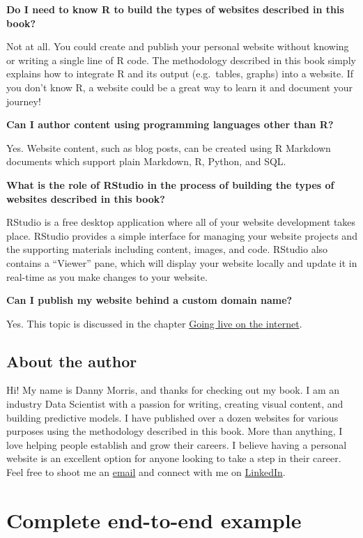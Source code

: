 \documentclass[
]{book}
\begin{document}
\textbf{Do I need to know R to build the types of websites described in this book?}

Not at all. You could create and publish your personal website without knowing or writing a single line of R code. The methodology described in this book simply explains how to integrate R and its output (e.g.~tables, graphs) into a website. If you don't know R, a website could be a great way to learn it and document your journey!

\textbf{Can I author content using programming languages other than R?}

Yes. Website content, such as blog posts, can be created using R Markdown documents which support plain Markdown, R, Python, and SQL.

\textbf{What is the role of RStudio in the process of building the types of websites described in this book?}

RStudio is a free desktop application where all of your website development takes place. RStudio provides a simple interface for managing your website projects and the supporting materials including content, images, and code. RStudio also contains a ``Viewer'' pane, which will display your website locally and update it in real-time as you make changes to your website.

\textbf{Can I publish my website behind a custom domain name?}

Yes. This topic is discussed in the chapter \protect\hyperlink{deploy}{Going live on the internet}.

\hypertarget{about-the-author}{%
\section{About the author}\label{about-the-author}}

Hi! My name is Danny Morris, and thanks for checking out my book. I am an industry Data Scientist with a passion for writing, creating visual content, and building predictive models. I have published over a dozen websites for various purposes using the methodology described in this book.
More than anything, I love helping people establish and grow their careers. I believe having a personal website is an excellent option for anyone looking to take a step in their career. Feel free to shoot me an \href{mailto:dmorris10667@gmail.com}{email} and connect with me on \href{https://www.linkedin.com/in/drmorris87/}{LinkedIn}.

\hypertarget{complete-end-to-end-example}{%
\chapter{Complete end-to-end example}\label{complete-end-to-end-example}}
\end{document}
